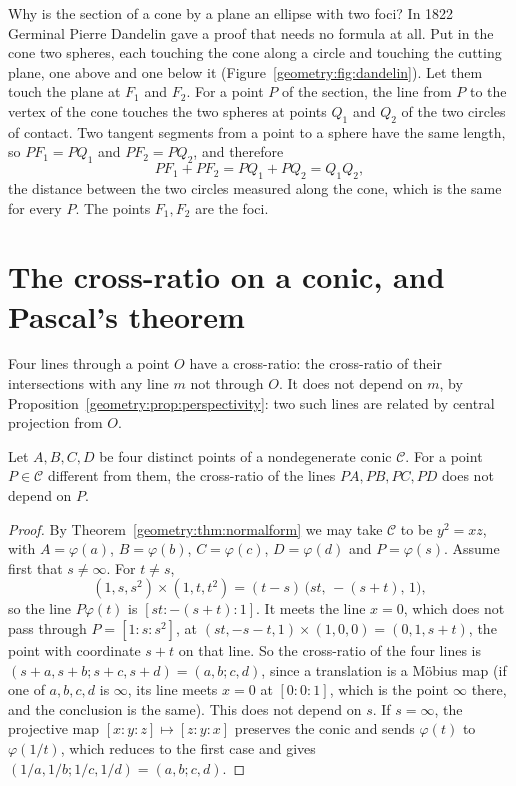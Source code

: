 \begin{beauty}
Why is the section of a cone by a plane an ellipse with two foci? In 1822 Germinal Pierre Dandelin gave a proof that needs no formula at all. Put in the
cone two spheres, each touching the cone along a circle and touching the cutting plane, one above and one below it (Figure~\ref{geometry:fig:dandelin}). Let
them touch the plane at $F_1$ and $F_2$. For a point $P$ of the section, the line from $P$ to the vertex of the cone touches the two spheres at
points $Q_1$ and $Q_2$ of the two circles of contact. Two tangent segments from a point to a sphere have the same length, so $PF_1=PQ_1$ and
$PF_2=PQ_2$, and therefore
\[
PF_1+PF_2=PQ_1+PQ_2=Q_1Q_2,
\]
the distance between the two circles measured along the cone, which is the same for every $P$. The points $F_1,F_2$ are the foci.
\end{beauty}

\section{The cross-ratio on a conic, and Pascal's theorem}

Four lines through a point $O$ have a cross-ratio: the cross-ratio of their intersections with any line $m$ not through $O$. It does not depend on
$m$, by Proposition~\ref{geometry:prop:perspectivity}: two such lines are related by central projection from $O$.

\begin{theorem}\label{geometry:thm:chaslesconic}
Let $A,B,C,D$ be four distinct points of a nondegenerate conic $\mathcal C$. For a point $P\in\mathcal C$ different from them, the cross-ratio of the
lines $PA,PB,PC,PD$ does not depend on $P$.
\end{theorem}

\begin{proof}
By Theorem~\ref{geometry:thm:normalform} we may take $\mathcal C$ to be $y^2=xz$, with $A=\varphi(a)$, $B=\varphi(b)$, $C=\varphi(c)$, $D=\varphi(d)$ and
$P=\varphi(s)$. Assume first that $s\ne\infty$. For $t\ne s$,
\[
(1,s,s^2)\times(1,t,t^2)=(t-s)\,\bigl(st,\,-(s+t),\,1\bigr),
\]
so the line $P\varphi(t)$ is $[st:-(s+t):1]$. It meets the line $x=0$, which does not pass through $P=[1:s:s^2]$, at
$(st,-s-t,1)\times(1,0,0)=(0,1,s+t)$, the point with coordinate $s+t$ on that line. So the cross-ratio of the four lines is
$(s+a,s+b;s+c,s+d)=(a,b;c,d)$, since a translation is a M\"obius map (if one of $a,b,c,d$ is $\infty$, its line meets $x=0$ at $[0:0:1]$, which is
the point $\infty$ there, and the conclusion is the same). This does not depend on $s$. If $s=\infty$, the projective map $[x:y:z]\mapsto[z:y:x]$
preserves the conic and sends $\varphi(t)$ to $\varphi(1/t)$, which reduces to the first case and gives $(1/a,1/b;1/c,1/d)=(a,b;c,d)$.
\end{proof}

